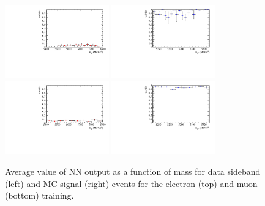 \begin{figure}
\centering
\includegraphics[width=0.4\textwidth]{RKst/figs/Training/EE_wNB_vs_MPV_bkg.pdf}
\includegraphics[width=0.4\textwidth]{RKst/figs/Training/EE_wNB_vs_MPV_sgn.pdf}
\includegraphics[width=0.4\textwidth]{RKst/figs/Training/MM_wNB_vs_MPV_bkg.pdf}
\includegraphics[width=0.4\textwidth]{RKst/figs/Training/MM_wNB_vs_MPV_sgn.pdf}
\caption{Average value of NN output as a function of \Bz mass for data
sideband (left) and MC signal (right) events for the electron (top) and muon (bottom) training.}
\label{fig:RKst_NNprofiles}
\end{figure}


